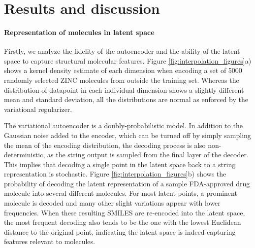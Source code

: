\documentclass[journal=acscii,manuscript=article]{achemso}
\begin{document}

\section{Results and discussion}
\paragraph{Representation of molecules in latent space}
Firstly, we analyze the fidelity of the autoencoder and the ability of the latent space to capture structural molecular features.
Figure \ref{fig:interpolation_figures}a) shows a kernel density estimate of each dimension when encoding a set of 5000 randomly selected ZINC molecules from outside the training set. 
 Whereas the distribution of datapoint in each individual dimension shows a slightly different mean and standard deviation, all the distributions are normal as enforced by the variational regularizer. 

The variational autoencoder is a doubly-probabilistic model. In addition to the Gaussian noise added to the encoder, which can be turned off by simply sampling the mean of the encoding distribution, the decoding process is also non-deterministic, as the string output is sampled from the final layer of the decoder.
This implies that decoding a single point in the latent space back to a string representation is stochastic. Figure \ref{fig:interpolation_figures}b) shows the probability of decoding the latent representation of a sample FDA-approved drug molecule into several different molecules. For most latent points, a prominent molecule is decoded and many other slight variations appear with lower frequencies. When these resulting SMILES are re-encoded into the latent space, the most frequent decoding also tends to be the one with the lowest Euclidean distance to the original point, indicating the latent space is indeed capturing features relevant to molecules. 
\end{document}
